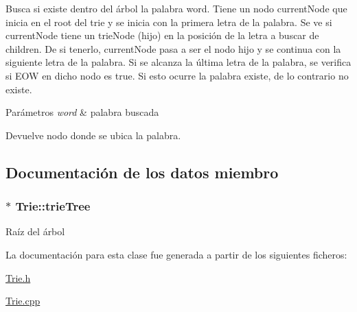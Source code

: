 Busca si existe dentro del árbol la palabra word. Tiene un nodo current\-Node que inicia en el root del trie y se inicia con la primera letra de la palabra. Se ve si current\-Node tiene un trie\-Node (hijo) en la posición de la letra a buscar de children. De si tenerlo, current\-Node pasa a ser el nodo hijo y se continua con la siguiente letra de la palabra. Si se alcanza la última letra de la palabra, se verifica si E\-O\-W en dicho nodo es true. Si esto ocurre la palabra existe, de lo contrario no existe.


\begin{DoxyParams}{Parámetros}
{\em word} & palabra buscada \\
\hline
\end{DoxyParams}
\begin{DoxyReturn}{Devuelve}
nodo donde se ubica la palabra. 
\end{DoxyReturn}


\subsection{Documentación de los datos miembro}
\hypertarget{class_trie_a301aa208fe6fc7abaaf264c117070ed6}{
\subsubsection[{trie\-Tree}]{$\ast$ Trie\-::trie\-Tree}}\label{class_trie_a301aa208fe6fc7abaaf264c117070ed6}
Raíz del árbol 

La documentación para esta clase fue generada a partir de los siguientes ficheros\-:\begin{DoxyCompactItemize}
\item 
\hyperlink{_trie_8h}{Trie.\-h}\item 
\hyperlink{_trie_8cpp}{Trie.\-cpp}\end{DoxyCompactItemize}
